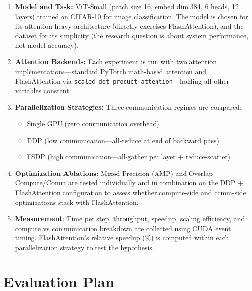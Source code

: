 \documentclass[12pt, a4paper]{article}
\begin{document}
\begin{enumerate}
    \item \textbf{Model and Task:} ViT-Small (patch size 16, embed dim 384, 6 heads, 12 layers) trained on CIFAR-10 for image classification. The model is chosen for its attention-heavy architecture (directly exercises FlashAttention), and the dataset for its simplicity (the research question is about system performance, not model accuracy).

    \item \textbf{Attention Backends:} Each experiment is run with two attention implementations---standard PyTorch math-based attention and FlashAttention via \texttt{scaled\_dot\_product\_attention}---holding all other variables constant.

    \item \textbf{Parallelization Strategies:} Three communication regimes are compared:
    \begin{itemize}
        \item Single GPU (zero communication overhead)
        \item DDP (low communication---all-reduce at end of backward pass)
        \item FSDP (high communication---all-gather per layer + reduce-scatter)
    \end{itemize}

    \item \textbf{Optimization Ablations:} Mixed Precision (AMP) and Overlap Compute/Comm are tested individually and in combination on the DDP + FlashAttention configuration to assess whether compute-side and comm-side optimizations stack with FlashAttention.

    \item \textbf{Measurement:} Time per step, throughput, speedup, scaling efficiency, and compute vs communication breakdown are collected using CUDA event timing. FlashAttention's relative speedup (\%) is computed within each parallelization strategy to test the hypothesis.
\end{enumerate}

\section{Evaluation Plan}
\end{document}
